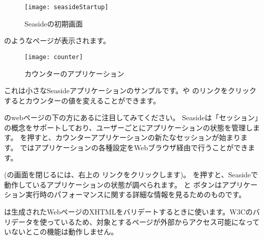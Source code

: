 \documentclass[a4paper,10pt,twoside]{book}
\begin{document}
\begin{figure}[tbh]
\begin{center}
\texttt{[image: seasideStartup]}
\caption{Seasideの初期画面}
\end{center}
\end{figure}


\noindent
{}のようなページが表示されます。

\noindent
{}


\begin{figure}[htb]
\begin{center}
\texttt{[image: counter]}
\caption{カウンターのアプリケーション}
\end{center}
\end{figure}

\noindent
これは小さなSeasideアプリケーションのサンプルです。\link{++}や \link{--\,--}のリンクをクリックするとカウンターの値を変えることができます。

\noindent
{}

のwebページの下の方にあるに注目してみてください。
Seasideは「セッション」の概念をサポートしており、ユーザーごとにアプリケーションの状態を管理します。
 を押すと、カウンターアプリケーションの新たなセッションが始まります。
 ではアプリケーションの各種設定をWebブラウザ経由で行うことができます。

(の画面を閉じるには、右上の  リンクをクリックします)。
 を押すと、Seasideで動作しているアプリケーションの状態が調べられます。
 と  ボタンはアプリケーション実行時のパフォーマンスに関する詳細な情報を見るためのものです。

 は生成されたWebページのXHTMLをバリデートするときに使います。W3Cのバリデータを使っているため、対象とするページが外部からアクセス可能になっていないとこの機能は動作しません。
\end{document}
